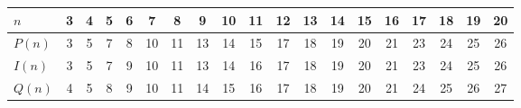 \documentclass[a4paper, 11pt]{article}
\begin{document}
    \begin{tabular}{|l|c|c|c|c|c|c|c|c|c|c|c|c|c|c|c|c|c|c|} %
        \hline
        $n$ & 3 & 4 & 5 & 6 & 7 & 8 & 9 & 10 & 11 & 12 & 13 & 14 & 15 & 16 & 17 & 18 & 19 & 20  \\ 
        \hline
        $P(n)$ & 3  & 5 & 7 & 8 & 10 & 11 & 13 & 14 & 15 & 17 & 18 & 19 & 20 & 21 & 23 & 24 & 25 & 26 \\ 
        \hline
        $I(n)$ & 3  & 5 & 7 & 9 & 10 & 11 & 13 & 14 & 16 & 17 & 18 & 19 & 20 & 21 & 23 & 24 & 25 & 26 \\ 
        \hline
        $Q(n)$ & 4  & 5 & 8 & 9 & 10 & 11 & 14 & 15 & 16 & 17 & 18 & 19 & 20 & 21 & 24 & 25 & 26 & 27 \\ 
        \hline
    \end{tabular}
\end{document}
